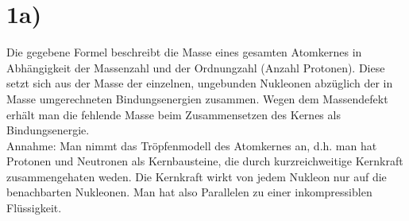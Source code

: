 





%
%
%
%
%

\section{1a)}
Die gegebene Formel beschreibt die Masse eines gesamten Atomkernes in Abhängigkeit der Massenzahl und der Ordnungzahl (Anzahl Protonen). Diese setzt sich aus der Masse der einzelnen, ungebunden Nukleonen abzüglich der in Masse umgerechneten Bindungsenergien zusammen. Wegen dem Massendefekt erhält man die fehlende Masse beim Zusammensetzen des Kernes als Bindungsenergie.\\
Annahme: Man nimmt das Tröpfenmodell des Atomkernes an, d.h. man hat Protonen und Neutronen als Kernbausteine, die durch kurzreichweitige Kernkraft zusammengehaten weden. Die Kernkraft wirkt von jedem Nukleon nur auf die benachbarten Nukleonen. Man hat also Parallelen zu einer inkompressiblen Flüssigkeit.\\

